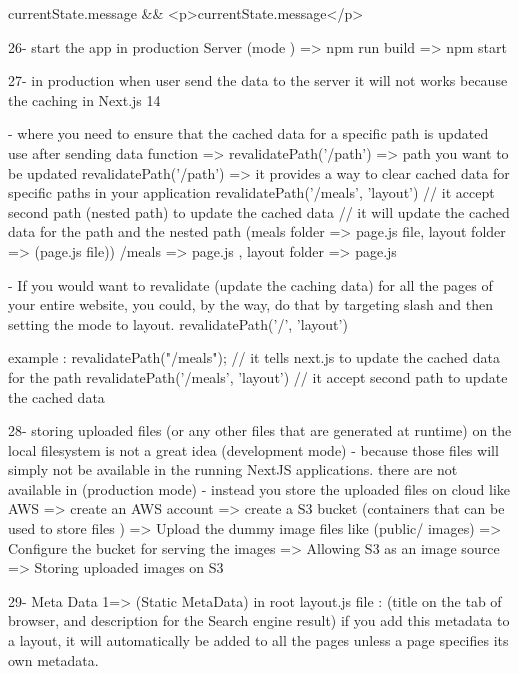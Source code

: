           {currentState.message && <p>{currentState.message}</p>}

26- start the app in production Server (mode )
    => npm run build 
    => npm start 


27- in production when user send the data to the server it will not works because the caching in Next.js 14
    
    - where you need to ensure that the cached data for a specific path is updated 
        use after sending data function => 
            revalidatePath('/path') => path you want to be updated
            revalidatePath('/path') => it provides a way to clear cached data for specific paths in your application
            revalidatePath('/meals', 'layout') // it accept second path (nested path) to update the cached data 
                // it will update the cached data for the path and the nested path
                (meals folder => page.js file, layout folder => (page.js file)) /meals => page.js , layout folder => page.js

            - If you would want to revalidate (update the caching data) for all the pages 
                of your entire website, you could, by the way, do that
                by targeting slash and then setting the mode to layout.
                revalidatePath('/', 'layout')

            example : 
              revalidatePath("/meals"); // it tells next.js to update the cached data for the path
              revalidatePath('/meals', 'layout') // it accept second path to update the cached data 

28- storing uploaded files (or any other files that are generated at runtime) on the local filesystem is not a great idea (development mode)
    - because those files will simply not be available in the running NextJS applications. there are not available in (production mode)
    - instead you store the uploaded files on cloud like AWS
            => create an AWS account 
            => create a S3 bucket (containers that can be used to store files )
            => Upload the dummy image files like (public/ images)
            => Configure the bucket for serving the images
            => Allowing S3 as an image source
            => Storing uploaded images on S3
      
29- Meta Data 
    1=> (Static MetaData) in root layout.js file : (title on the tab of browser, and description for the Search engine result)
        if you add this metadata to a layout, it will automatically be added to all the pages
        unless a page specifies its own metadata.

